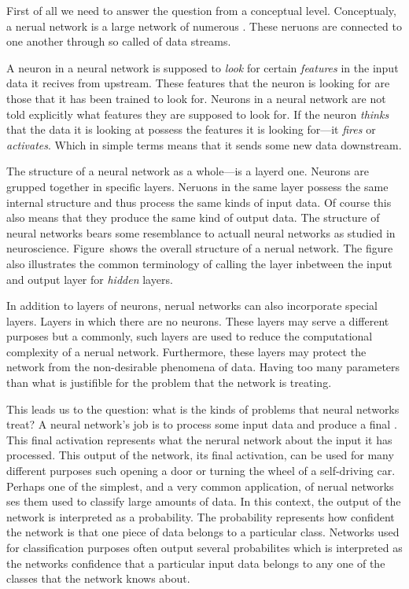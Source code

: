 \startsection[title=Machine learning concepts]
First of all we need to answer the question  from a conceptual level.
Conceptualy, a nerual network is a large network of numerous .
These neruons are connected to one another through so called  of data streams.

A neuron in a neural network is supposed to {\em look} for certain {\em features} in the input data it recives from upstream.
These features that the neuron is looking for are those that it has been trained to look for.
Neurons in a neural network are not told explicitly what features they are supposed to look for.
If the neuron {\em thinks} that the data it is looking at possess the features it is looking for---it {\em fires} or {\em activates}.
Which in simple terms means that it sends some new data downstream.

The structure of a neural network as a whole---is a layerd one.
Neurons are grupped together in specific layers.
Neruons in the same layer possess the same internal structure and thus process the same kinds of input data.
Of course this also means that they produce the same kind of output data.
The structure of neural networks bears some resemblance to actuall neural networks as studied in neuroscience.
Figure~ shows the overall structure of a nerual network.
The figure also illustrates the common terminology of calling the layer inbetween the input and output layer for {\em hidden} layers.

\startplacefigure[
    reference=network-general-structure,
    location=bottom,
    title={Overview of a nerual network structure~\cite[noah_2018]},
]
\stopplacefigure

In addition to layers of neurons, nerual networks can also incorporate special  layers.
Layers in which there are no neurons.
These layers may serve a different purposes but a commonly, such layers are used to reduce the computational complexity of a nerual network.
Furthermore, these layers may protect the network from the non-desirable phenomena of  data.
Having too many parameters than what is justifible for the problem that the network is treating.

This leads us to the question: what is the kinds of problems that neural networks treat?
A neural network's job is to process some input data and produce a final .
This final activation represents what the nerural network  about the input it has processed.
This output of the network, its final activation, can be used for many different purposes such opening a door or turning the wheel of a self-driving car.
Perhaps one of the simplest, and a very common application, of nerual networks ses them used to classify large amounts of data.
In this context, the output of the network is interpreted as a probability.
The probability represents how confident the network is that one piece of data belongs to a particular class.
Networks used for classification purposes often output several probabilites which is interpreted as the networks confidence that a particular input data belongs to any one of the classes that the network knows about.

